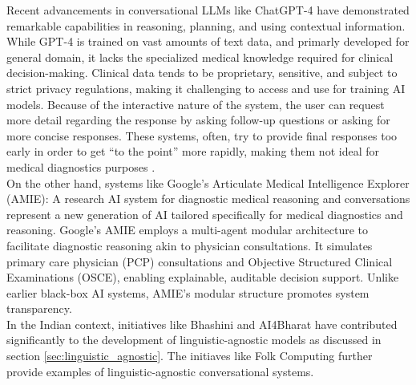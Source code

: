 \noindent Recent advancements in conversational LLMs like ChatGPT-4 have demonstrated remarkable capabilities in reasoning, planning, and using contextual information. While GPT-4 is trained on vast amounts of text data, and primarly developed for general domain, it lacks the specialized medical knowledge required for clinical decision-making. Clinical data tends to be proprietary, sensitive, and subject to strict privacy regulations, making it challenging to access and use for training AI models. Because of the interactive nature of the system, the user can request more detail regarding the response by asking follow-up questions or asking for more concise responses. These systems, often, try to provide final responses too early in order to get “to the point” more rapidly, making them not ideal for medical diagnostics purposes \cite{lee2023benefits}.\\[\baselineskip]


\noindent On the other hand, systems like Google's Articulate Medical Intelligence Explorer (AMIE): A research AI system for diagnostic medical reasoning and conversations \cite{karthikesalingam2024amie} represent a new generation of AI tailored specifically for medical diagnostics and reasoning. Google's AMIE employs a multi-agent modular architecture to facilitate diagnostic reasoning akin to physician consultations. It simulates primary care physician (PCP) consultations and Objective Structured Clinical Examinations (OSCE), enabling explainable, auditable decision support. Unlike earlier black-box AI systems, AMIE's modular structure promotes system transparency.\\[\baselineskip]

\noindent In the Indian context, initiatives like Bhashini and AI4Bharat have contributed significantly to the development of linguistic-agnostic models as discussed in section \ref{sec:linguistic_agnostic}. The initiaves like Folk Computing further provide examples of linguistic-agnostic conversational systems.\\[\baselineskip]

